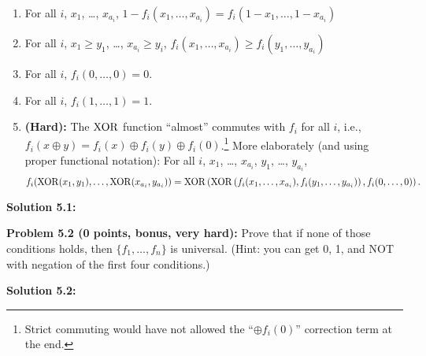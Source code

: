 \documentclass[11pt]{article}
\begin{document}
\begin{enumerate}
\item For all $i$, $x_1$, \ldots, $x_{a_i}$, $1-f_i(x_1, \ldots, x_{a_i}) = f_i(1-x_1, \ldots, 1-x_{a_i})$
\item For all $i$, $x_1 \ge y_1$, \ldots, $x_{a_i} \ge y_i$, $f_i(x_1, \ldots, x_{a_i}) \ge f_i(y_1, \ldots, y_{a_i})$
\item For all $i$, $f_i(0, \ldots, 0) = 0$.
\item For all $i$, $f_i(1, \ldots, 1) = 1$.
\item {\bf (Hard):} The $\mathrm{XOR}$ function ``almost'' commutes with $f_i$ for all $i$, i.e., $f_i(x \oplus y) = f_i(x) \oplus f_i(y) \oplus f_i(0)$.\footnote{Strict commuting would have not allowed the ``$\oplus f_i(0)$'' correction term at the end.} More elaborately (and using proper functional notation): For all $i$, $x_1$, \ldots, $x_{a_i}$, $y_1$, \ldots, $y_{a_i}$, 
$$f_i(\mathrm{XOR}(x_1, y_1), \ldots, \mathrm{XOR}(x_{a_i}, y_{a_i})) = \mathrm{XOR} \left(\mathrm{XOR}\left(f_i(x_1, \ldots, x_{a_i}),f_i(y_1, \ldots, y_{a_i})\right),f_i(0,\ldots,0) \right).$$
\end{enumerate}

\textbf{Solution 5.1:} %

\textbf{Problem 5.2 (0 points, bonus, very hard):} Prove that if none of those conditions holds, then $\{f_1, \ldots, f_n\}$ is universal. (Hint: you can get 0, 1, and NOT with negation of the first four conditions.)

\textbf{Solution 5.2:} %
\end{document}
